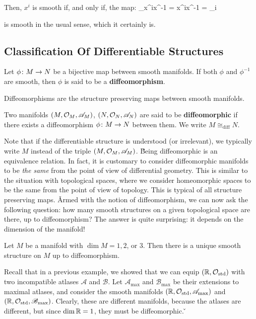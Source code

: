 \vspace{12pt}

Then, $x^i$ is smooth if, and only if, the map:
\bse
{\id_\R}\circ x^i\circ x^{-1} = x^i\circ x^{-1} = \proj_i
\ese

is smooth in the usual sense, which it certainly is.
\ee

\subsection{Classification Of Differentiable Structures}

\bd [Diffeomorphism]
Let $\phi\colon M \to N$ be a bijective map between smooth manifolds. If both $\phi$ and $\phi^{-1}$ are smooth, then
$\phi$ is said to be a \textbf{diffeomorphism}.
\ed

Diffeomorphisms are the structure preserving maps between smooth manifolds.

Two manifolds $(M,\mathcal{O}_M,\mathscr{A}_M)$, $(N,\mathcal{O}_N,\mathscr{A}_N)$ are said to be \textbf{diffeomorphic} if there
exists a diffeomorphism $\phi\colon M\to N$ between them. We write $M \cong_\text{diff}N$.
\ed

Note that if the differentiable structure is understood (or irrelevant), we typically write $M$ instead of the triple
$(M,\mathcal{O}_M,\mathscr{A}_M)$. \v

Being diffeomorphic is an equivalence relation. In fact, it is customary to consider diffeomorphic manifolds to be
\emph{the same} from the point of view of differential geometry. This is similar to the situation with topological
spaces, where we consider homeomorphic spaces to be the same from the point of view of topology. This is typical of
all structure preserving maps. \v

Armed with the notion of diffeomorphism, we can now ask the following question: how many smooth structures on a given
topological space are there, up to diffeomorphism? The answer is quite surprising: it depends on the dimension of the
manifold!

Let $M$ be a manifold with $\dim M = 1, 2$, or $3$. Then there is a unique smooth structure on $M$ up to diffeomorphism.
\et

Recall that in a previous example, we showed that we can equip $(\mathbb{R},\mathcal{O}_\mathrm{std})$ with two incompatible atlases
$\mathscr{A}$ and $\mathscr{B}$. Let $\mathscr{A}_\mathrm{\max}$ and $\mathscr{B}_\mathrm{\max}$ be their extensions to
maximal atlases, and consider the smooth manifolds $(\mathbb{R},\mathcal{O}_\mathrm{std},\mathscr{A}_\mathrm{\max})$ and $(\mathbb{R},
\mathcal{O}_\mathrm{std},\mathscr{B}_\mathrm{\max})$. Clearly, these are different manifolds, because the atlases are
different, but since $\dim \mathbb{R}=1$, they must be diffeomorphic. \v


